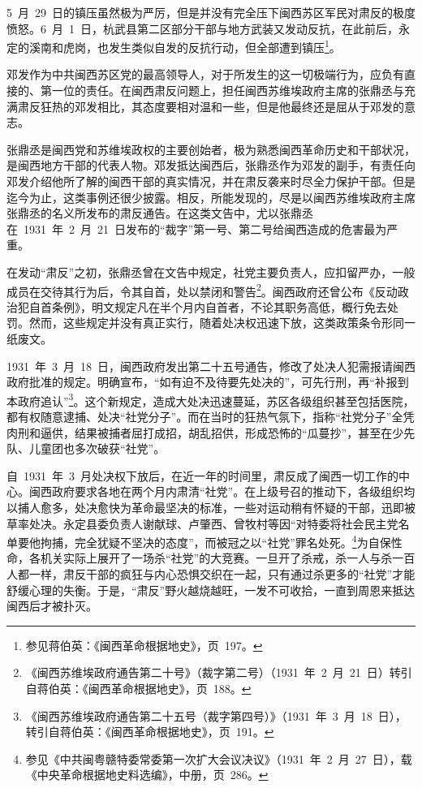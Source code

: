 5~月~29~日的镇压虽然极为严厉，但是并没有完全压下闽西苏区军民对肃反的极度愤怒。6~月~1~日，杭武县第二区部分干部与地方武装又发动反抗，在此前后，永定的溪南和虎岗，也发生类似自发的反抗行动，但全部遭到镇压\footnote{参见蒋伯英：《闽西革命根据地史》，页~197。}。

邓发作为中共闽西苏区党的最高领导人，对于所发生的这一切极端行为，应负有直接的、第一位的责任。在闽西肃反问题上，担任闽西苏维埃政府主席的张鼎丞与充满肃反狂热的邓发相比，其态度要相对温和一些，但是他最终还是屈从于邓发的意志。

张鼎丞是闽西党和苏维埃政权的主要创始者，极为熟悉闽西革命历史和干部状况，是闽西地方干部的代表人物。邓发抵达闽西后，张鼎丞作为邓发的副手，有责任向邓发介绍他所了解的闽西干部的真实情况，并在肃反袭来时尽全力保护干部。但是迄今为止，这类事例还很少披露。相反，所能发现的，尽是以闽西苏维埃政府主席张鼎丞的名义所发布的肃反通告。在这类文告中，尤以张鼎丞在~1931~年~2~月~21~日发布的“裁字”第一号、第二号给闽西造成的危害最为严重。

在发动“肃反”之初，张鼎丞曾在文告中规定，社党主要负责人，应扣留严办，一般成员在交待其行为后，令其自首，处以禁闭和警告\footnote{《闽西苏维埃政府通告第二十号》（裁字第二号）（1931~年~2~月~21~日）转引自蒋伯英：《闽西革命根据地史》，页~188。}。闽西政府还曾公布《反动政治犯自首条例》，明文规定凡在半个月内自首者，不论其职务高低，概行免去处罚。然而，这些规定并没有真正实行，随着处决权迅速下放，这类政策条令形同一纸废文。

1931~年~3~月~18~日，闽西政府发出第二十五号通告，修改了处决人犯需报请闽西政府批准的规定。明确宣布，“如有迫不及待要先处决的”，可先行刑，再“补报到本政府追认”\footnote{《闽西苏维埃政府通告第二十五号（裁字第四号）》（1931~年~3~月~18~日），转引自蒋伯英：《闽西革命根据地史》，页~191。}。这个新规定，造成大处决迅速蔓延，苏区各级组织甚至包括医院，都有权随意逮捕、处决“社党分子”。而在当时的狂热气氛下，指称“社党分子”全凭肉刑和逼供，结果被捕者屈打成招，胡乱招供，形成恐怖的“瓜蔓抄”，甚至在少先队、儿童团也多次破获“社党”。

自~1931~年~3~月处决权下放后，在近一年的时间里，肃反成了闽西一切工作的中心。闽西政府要求各地在两个月内肃清“社党”。在上级号召的推动下，各级组织均以捕人愈多，处决愈快为革命最坚决的标准，一些对运动稍有怀疑的干部，迅即被草率处决。永定县委负责人谢献球、卢肇西、曾牧村等因“对特委将社会民主党名单要他拘捕，完全犹疑不坚决的态度”，而被冠之以“社党”罪名处死。\footnote{参见《中共闽粤赣特委常委第一次扩大会议决议》（1931~年~2~月~27~日），载《中央革命根据地史料选编》，中册，页~286。}为自保性命，各机关实际上展开了一场杀“社党”的大竞赛。一旦开了杀戒，杀一人与杀一百人都一样，肃反干部的疯狂与内心恐惧交织在一起，只有通过杀更多的“社党”才能舒缓心理的失衡。于是，“肃反”野火越烧越旺，一发不可收拾，一直到周恩来抵达闽西后才被扑灭。


